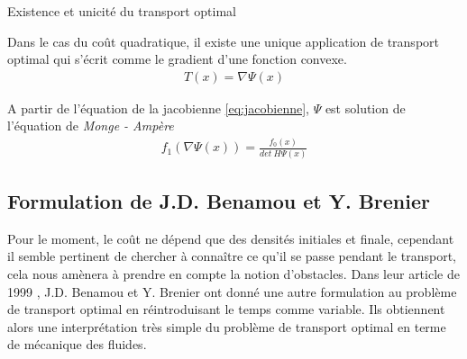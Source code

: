 \documentclass[a4paper,12pt]{article}
\begin{document}

\begin{theoreme}{Existence et unicité du transport optimal}

\end{theoreme}
\begin{preuve}

\end{preuve}

\begin{theoreme}{}
Dans le cas du coût quadratique, il existe une unique application de transport optimal qui s'écrit comme le gradient d'une fonction convexe. 
\begin{align}
T(x) = \nabla \Psi(x)
\label{eq:opttrspGrdient}
\end{align}
\end{theoreme}
\begin{preuve}

\end{preuve}
A partir de l'équation de la jacobienne \eqref{eq:jacobienne}, $\Psi$ est solution de l'équation de \emph{Monge - Ampère} 
\begin{align}
f_1(\nabla\Psi(x)) = \frac{f_0(x)}{det\ H\Psi(x)}
\label{eq:mongemapere}
\end{align}


\subsection{Formulation de J.D. Benamou et Y. Brenier}
Pour le moment, le coût ne dépend que des densités initiales et finale, cependant il semble pertinent de chercher à connaître ce qu'il se passe pendant le transport, cela nous amènera à prendre en compte la notion d'obstacles. 
Dans leur article de 1999 \cite{benamoubrenier}, J.D. Benamou et Y. Brenier ont donné une autre formulation au problème de transport optimal en réintroduisant le temps comme variable. Ils obtiennent alors une interprétation très simple du problème de transport optimal en terme de mécanique des fluides. 
\end{document}
